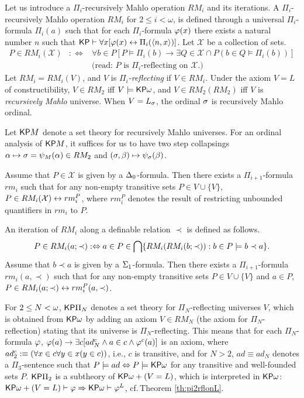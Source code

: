 \documentclass{article}
\begin{document}
Let us introduce a $\Pi_{i}$-recursively Mahlo operation $RM_{i}$ and its iterations.
A $\Pi_{i}$-recursively Mahlo operation $RM_{i}$ for $2\leq i<\omega$, 
is defined through a universal $\Pi_{i}$-formula 
$\Pi_{i}(a)$ such that for each $\Pi_{i}$-formula $\varphi(x)$ there exists a natural number $n$ such that
${\sf KP}\vdash \forall x[\varphi(x)\leftrightarrow \Pi_{i}(\langle n,x\rangle)]$.
Let $\mathcal{X}$ be a collection of sets.
\begin{eqnarray*}
P\in RM_{i}(\mathcal{X}) & :\Leftrightarrow & \forall b\in P
\left[
P\models\Pi_{i}(b) \to \exists Q\in \mathcal{X}\cap P(b\in Q\models\Pi_{i}(b))
\right]
\\
&&\mbox{(read: } P \mbox{ is } \Pi_{i}\mbox{-reflecting on } \mathcal{X}\mbox{.)}
\end{eqnarray*}
Let $RM_{i}=RM_{i}(V)$, and $V$ is \textit{$\Pi_{i}$-reflecting} if $V\in RM_{i}$.
Under the axiom $V=L$ of constructibility,
$V\in RM_{2}$ iff $V\models{\sf KP}\omega$,
and
$V\in RM_{2}(RM_{2})$ iff $V$ is \textit{recursively Mahlo} universe.
When $V=L_{\sigma}$, the ordinal $\sigma$ is recursively Mahlo ordinal.

Let ${\sf KP}M$ denote a set theory for recursively Mahlo universes.
For an ordinal analysis of ${\sf KP}M$, it suffices for us to have two step collapsings
$\alpha\mapsto\sigma=\psi_{M}(\alpha)\in RM_{2}$ and
$(\sigma,\beta)\mapsto\psi_{\sigma}(\beta)$.



Assume that $P\in\mathcal{X}$ is given by a $\Delta_{0}$-formula.
Then there exists a $\Pi_{i+1}$-formula $rm_{i}$ such that
for any non-empty transitive sets $P\in V\cup\{V\}$,
$P\in RM_{i}(\mathcal{X})\leftrightarrow rm_{i}^{P}$,
where $rm_{i}^{P}$ denotes the result of restricting unbounded quantifiers in $rm_{i}$ to $P$.

An iteration of $RM_{i}$ along a definable relation $\prec$ is defined as follows.
\[
P\in RM_{i}(a;\prec) :\Leftrightarrow a\in P\in\bigcap\{ RM_{i}(RM_{i}(b;\prec)): b\in P\models b\prec a\}.
\]
Assume that $b\prec a$ is given by a $\Sigma_{1}$-formula.
Then there exists a $\Pi_{i+1}$-formula $rm_{i}(a,\prec)$ such that
for any non-empty transitive sets $P\in V\cup\{V\}$ and $a\in P$,
$P\in RM_{i}(a;\prec)\leftrightarrow rm_{i}^{P}(a,\prec)$.



For $2\leq N<\omega$, ${\sf KP}\Pi_{N}$ denotes a set theory for $\Pi_{N}$-reflecting universes $V$,
which is obtained from ${\sf KP}\omega$ by adding an axiom $V\in RM_{N}$
(the axiom for $\Pi_{N}$-reflection) stating that
its universe is $\Pi_{N}$-reflecting.
This means that for each $\Pi_{N}$-formula $\varphi$,
$\varphi(a) \to \exists c[ad_{N}^{c}\land a\in c \land \varphi^{c}(a)]$ is an axiom,
where $ad_{2}^{c}:\equiv(\forall x\in c\forall y\in x(y\in c))$, i.e., $c$ is transitive,
and for $N>2$, $ad\equiv ad_{N}$ denotes 
a $\Pi_{3}$-sentence such that $P\models ad\Leftrightarrow P\models\mbox{{\sf KP}}\omega$
for any transitive and well-founded sets $P$.
${\sf KP}\Pi_{2}$ is a subtheory of ${\sf KP}\omega+(V=L)$, which is interpreted in ${\sf KP}\omega$:
${\sf KP}\omega+(V=L)\vdash\varphi \Rightarrow {\sf KP}\omega\vdash\varphi^{L}$, cf.\,Theorem \ref{th:pi2rflonL}.
\end{document}
